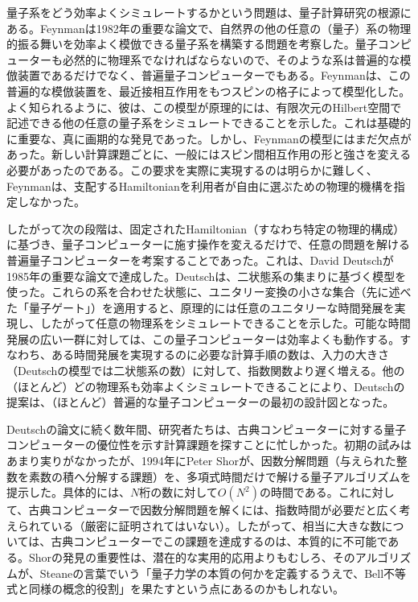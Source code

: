 量子系をどう効率よくシミュレートするかという問題は、量子計算研究の根源にある。Feynman\cite{ref335}は1982年の重要な論文で、自然界の他の任意の（量子）系の物理的振る舞いを効率よく模倣できる量子系を構築する問題を考察した。量子コンピューターも必然的に物理系でなければならないので、そのような系は普遍的な模倣装置であるだけでなく、普遍量子コンピューターでもある。Feynmanは、この普遍的な模倣装置を、最近接相互作用をもつスピンの格子によって模型化した。よく知られるように、彼は、この模型が原理的には、有限次元のHilbert空間で記述できる他の任意の量子系をシミュレートできることを示した。これは基礎的に重要な、真に画期的な発見であった。しかし、Feynmanの模型にはまだ欠点があった。新しい計算課題ごとに、一般にはスピン間相互作用の形と強さを変える必要があったのである。この要求を実際に実現するのは明らかに難しく、Feynmanは、支配するHamiltonianを利用者が自由に選ぶための物理的機構を指定しなかった。

したがって次の段階は、固定されたHamiltonian（すなわち特定の物理的構成）に基づき、量子コンピューターに施す操作を変えるだけで、任意の問題を解ける普遍量子コンピューターを考案することであった。これは、David Deutschが1985年の重要な論文\cite{ref337}で達成した。Deutschは、二状態系の集まりに基づく模型を使った。これらの系を合わせた状態に、ユニタリー変換の小さな集合（先に述べた「量子ゲート」）を適用すると、原理的には任意のユニタリーな時間発展を実現し、したがって任意の物理系をシミュレートできることを示した。可能な時間発展の広い一群に対しては、この量子コンピューターは効率よくも動作する\cite{ref338}。すなわち、ある時間発展を実現するのに必要な計算手順の数は、入力の大きさ（Deutschの模型では二状態系の数）に対して、指数関数より遅く増える。他の（ほとんど）どの物理系も効率よくシミュレートできることにより、Deutschの提案は、（ほとんど）普遍的な量子コンピューターの最初の設計図となった。

\hypertarget{srcpage:300}{}\label{srcpage:300}
Deutschの論文に続く数年間、研究者たちは、古典コンピューターに対する量子コンピューターの優位性を示す計算課題を探すことに忙しかった\cite{ref339,ref340,ref341,ref342,ref343}。初期の試みはあまり実りがなかったが、1994年にPeter Shor\cite{ref344,ref345}が、因数分解問題（与えられた整数を素数の積へ分解する課題）を、多項式時間だけで解ける量子アルゴリズムを提示した。具体的には、$N$桁の数に対して$O(N^2)$の時間である。これに対して、古典コンピューターで因数分解問題を解くには、指数時間が必要だと広く考えられている（厳密に証明されてはいない）。したがって、相当に大きな数については、古典コンピューターでこの課題を達成するのは、本質的に不可能である。Shorの発見の重要性は、潜在的な実用的応用よりもむしろ、そのアルゴリズムが、Steane\cite{ref336}の言葉でいう「量子力学の本質の何かを定義するうえで、Bell不等式と同様の概念的役割」を果たすという点にあるのかもしれない。

